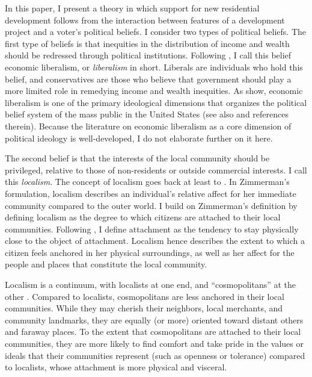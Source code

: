 \documentclass[article,11pt]{memoir}
\begin{document}
In this paper, I present a theory in which support for new residential development follows from the interaction between features of a development project and a voter's political beliefs.  I consider two types of political beliefs.  The first type of beliefs is that inequities in the distribution of income and wealth should be redressed through political institutions. Following \cite{treier_nature_2009}, I call this belief economic liberalism, or \emph{liberalism} in short. Liberals are individuals who hold this belief, and conservatives are those who believe that government should play a more limited role in remedying income and wealth inequities.  As \cite{treier_nature_2009} show, economic liberalism is one of the primary ideological dimensions that organizes the political belief system of the mass public in the United States (see also \cite{feldman_understanding_2014} and references therein). Because the literature on economic liberalism as a core dimension of political ideology is well-developed, I do not elaborate further on it here.

The second belief is that the interests of the local community should be privileged, relative to those of non-residents or outside commercial interests.  I call this \emph{localism}.  The concept of localism goes back at least to \cite{zimmerman_centralism_1938}. In Zimmerman's formulation, localism describes an individual's relative affect for her immediate community compared to the outer world. I build on Zimmerman's definition by defining localism as the degree to which citizens are attached to their local communities.  Following \cite{hidalgo_place_2001}, I define attachment as the tendency to stay physically close to the object of attachment.  Localism hence describes the extent to which a citizen feels anchored in her physical surroundings, as well as her affect for the people and places that constitute the local community.  

Localism is a continuum, with localists at one end, and ``cosmopolitans'' at the other \citep{dye_local-cosmopolitan_1963-1,merton_social_1968}. Compared to localists, cosmopolitans are less anchored in their local communities. While they may cherish their neighbors, local merchants, and community landmarks, they are equally (or more) oriented toward distant others and faraway places. To the extent that cosmopolitans are attached to their local communities, they are more likely to find comfort and take pride in the values or ideals that their communities represent (such as openness or tolerance) compared to localists, whose attachment is more physical and visceral.
\end{document}
